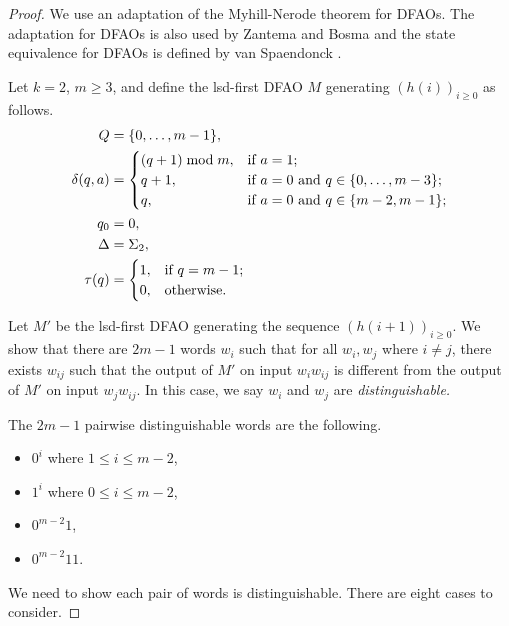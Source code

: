 \documentclass[12pt,reqno]{article}
\begin{document}
\begin{proof}
We use an adaptation of the Myhill-Nerode theorem \cite[\S 3.4]{hopcroft_introduction_1979} for DFAOs. The adaptation for DFAOs is also used by Zantema and Bosma \cite{zantema_complexity_2022} and the state equivalence for DFAOs is defined by van Spaendonck \cite{van_spaendonck_automatic_2020}.

Let $k=2$, $m \geq 3$, and define the lsd-first DFAO $M$ generating $(h(i))_{i \geq 0}$ as follows.
    \begin{align*}
        Q &= \{0, \ldots, m-1\}, \\
        \delta(q, a) &=
        \begin{cases}
            (q+1) \bmod m, &  \text{if $a=1$}; \\
            q+1, &  \text{if $a=0$ and $ q \in \{0, \ldots, m-3\}$}; \\
            q, & \text{if $a=0$ and $q \in \{m-2, m-1\}$;}
        \end{cases}
         \\
        q_0 &= 0, \\
        \Delta &= \Sigma_2, \\
        \tau(q) &=
        \begin{cases}
            1 , &  \text{if $q=m-1$}; \\
            0 , &  \text{otherwise}.
        \end{cases}
    \end{align*}

Let $M'$ be the lsd-first DFAO generating the sequence $(h(i+1))_{i \geq 0}$.  
    We show that there are  $2m-1$ words $w_i$ such that for all $w_i, w_j$ where $i \neq j$, there exists $w_{ij}$ such that the output of $M'$ on input $w_iw_{ij}$ is different from  the output of $M'$ on input $w_j w_{ij}$. In this case, we say $w_i$ and $w_j$ are {\it distinguishable.}

    The $2m-1$ pairwise distinguishable words are the following.
    \begin{itemize}[nosep]
        \item $0^i$ where $1 \leq i \leq m-2$,
        \item $1^i$ where $0 \leq i \leq m-2$,
        \item $0^{m-2}1$,
        \item $0^{m-2}11$.
    \end{itemize}
    
    We need to show each pair of words is distinguishable.  There are eight cases to consider.


\end{proof}
\end{document}
